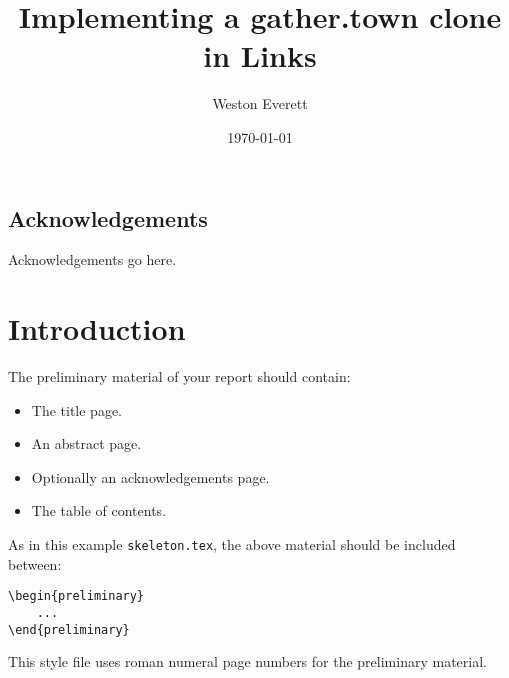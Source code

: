 \documentclass[bsc,frontabs,singlespacing,parskip,deptreport]{infthesis}
\begin{document}
\begin{preliminary}

\title{Implementing a gather.town clone in Links}

\author{Weston Everett}


\date{\today}


\maketitle

\section*{Acknowledgements}
Acknowledgements go here.

\tableofcontents
\end{preliminary}


\chapter{Introduction}

The preliminary material of your report should contain:
\begin{itemize}
\item
The title page.
\item
An abstract page.
\item
Optionally an acknowledgements page.
\item
The table of contents.
\end{itemize}

As in this example \texttt{skeleton.tex}, the above material should be
included between:
\begin{verbatim}
\begin{preliminary}
    ...
\end{preliminary}
\end{verbatim}
This style file uses roman numeral page numbers for the preliminary material.
\end{document}
